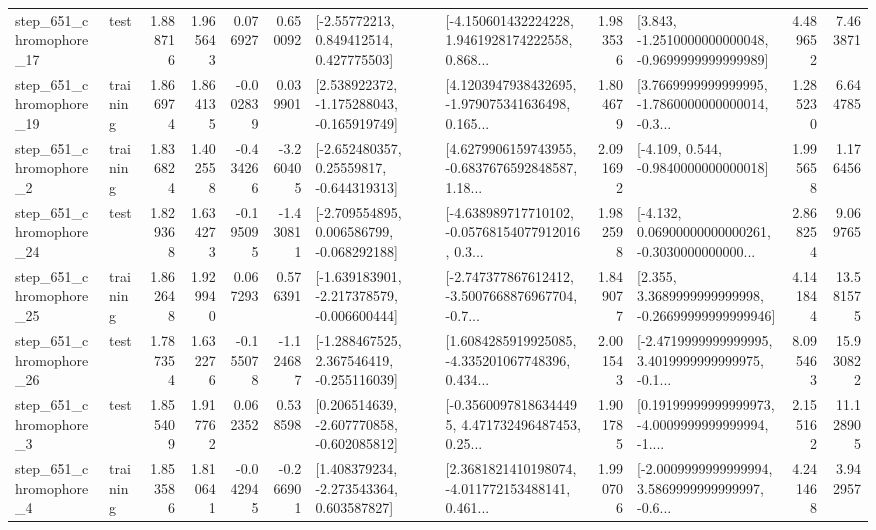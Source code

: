 \begin{tabular}{llrrrrllrlrr}
  step\_651\_chromophore\_17 &      test &      1.888716 &    1.965643 &      0.076927 &  0.650092 &     [-2.55772213, 0.849412514, 0.427775503] &  [-4.150601432224228, 1.9461928174222558, 0.868... &       1.983536 &  [3.843, -1.2510000000000048, -0.9699999999999989] &            4.489652 &          7.463871 \\
  step\_651\_chromophore\_19 &  training &      1.866974 &    1.864135 &     -0.002839 &  0.039901 &   [2.538922372, -1.175288043, -0.165919749] &  [4.1203947938432695, -1.979075341636498, 0.165... &       1.804679 &  [3.7669999999999995, -1.7860000000000014, -0.3... &            1.285230 &          6.644785 \\
   step\_651\_chromophore\_2 &  training &      1.836824 &    1.402558 &     -0.434266 & -3.260405 &    [-2.652480357, 0.25559817, -0.644319313] &  [4.6279906159743955, -0.6837676592848587, 1.18... &       2.091692 &               [-4.109, 0.544, -0.9840000000000018] &            1.995658 &          1.176456 \\
  step\_651\_chromophore\_24 &      test &      1.829368 &    1.634273 &     -0.195095 & -1.430811 &   [-2.709554895, 0.006586799, -0.068292188] &  [-4.638989717710102, -0.05768154077912016, 0.3... &       1.982598 &  [-4.132, 0.06900000000000261, -0.3030000000000... &            2.868254 &          9.069765 \\
  step\_651\_chromophore\_25 &  training &      1.862648 &    1.929940 &      0.067293 &  0.576391 &  [-1.639183901, -2.217378579, -0.006600444] &  [-2.747377867612412, -3.5007668876967704, -0.7... &       1.849077 &  [2.355, 3.3689999999999998, -0.26699999999999946] &            4.141844 &         13.581575 \\
  step\_651\_chromophore\_26 &      test &      1.787354 &    1.632276 &     -0.155078 & -1.124687 &   [-1.288467525, 2.367546419, -0.255116039] &  [1.6084285919925085, -4.335201067748396, 0.434... &       2.001543 &  [-2.4719999999999995, 3.4019999999999975, -0.1... &            8.095463 &         15.930822 \\
   step\_651\_chromophore\_3 &      test &      1.855409 &    1.917762 &      0.062352 &  0.538598 &   [0.206514639, -2.607770858, -0.602085812] &  [-0.35600978186344495, 4.471732496487453, 0.25... &       1.901785 &  [0.19199999999999973, -4.0009999999999994, -1.... &            2.155162 &         11.128905 \\
   step\_651\_chromophore\_4 &  training &      1.853586 &    1.810641 &     -0.042945 & -0.266901 &    [1.408379234, -2.273543364, 0.603587827] &  [2.3681821410198074, -4.011772153488141, 0.461... &       1.990706 &  [-2.0009999999999994, 3.5869999999999997, -0.6... &            4.241468 &          3.942957 \\

\end{tabular}
